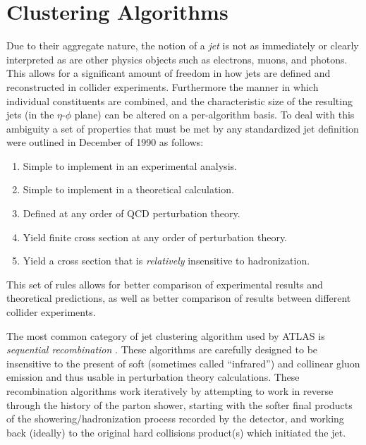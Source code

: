 \section{Clustering Algorithms}
Due to their aggregate nature, the notion of a \textit{jet} is not as immediately or clearly interpreted as are other physics objects such as electrons, muons, and photons.
This allows for a significant amount of freedom in how jets are defined and reconstructed in collider experiments.
Furthermore the manner in which individual constituents are combined, and the characteristic size of the resulting jets (in the $\eta$-$\phi$ plane) can be altered on a per-algorithm basis.
To deal with this ambiguity a set of properties that must be met by any standardized jet definition were outlined in December of 1990 \cite{Huth:217490} as follows:
\begin{enumerate}
    \itemsep0em 
    \item Simple to implement in an experimental analysis.
    \item Simple to implement in a theoretical calculation.
    \item Defined at any order of QCD perturbation theory.
    \item Yield finite cross section at any order of perturbation theory.
    \item Yield a cross section that is \textit{relatively} insensitive to hadronization.
\end{enumerate}
This set of rules allows for better comparison of experimental results and theoretical predictions, as well as better comparison of results between different collider experiments.

The most common category of jet clustering algorithm used by ATLAS is \textit{sequential recombination} \cite{Catani:1993hr}.
These algorithms are carefully designed to be insensitive to the present of soft (sometimes called ``infrared'') and collinear gluon emission and thus usable in perturbation theory calculations.
These recombination algorithms work iteratively by attempting to work in reverse through the history of the parton shower, starting with the softer final products of the showering/hadronization process recorded by the detector, and working back (ideally) to the original hard collisions product(s) which initiated the jet.

